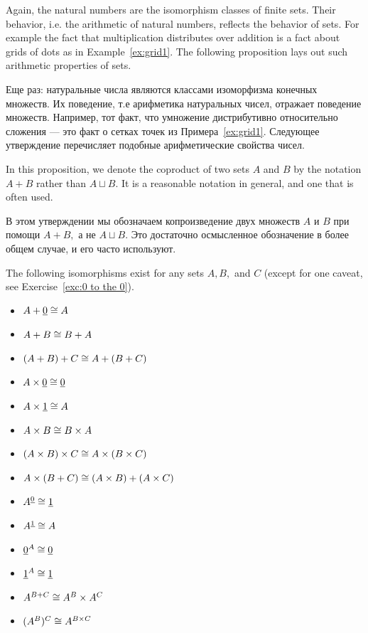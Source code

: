 \documentclass[CT4S-EN-RU]{subfiles}
\begin{document}
\begin{blockENG}
Again, the natural numbers are the isomorphism classes of finite sets. Their behavior, i.e. the arithmetic of natural numbers, reflects the behavior of sets. For example the fact that multiplication distributes over addition is a fact about grids of dots as in Example~\ref{ex:grid1}. The following proposition lays out such arithmetic properties of sets.
\end{blockENG}

\begin{blockRUS}
Еще раз: натуральные числа являются классами изоморфизма конечных множеств. Их поведение, т.е арифметика натуральных чисел, отражает поведение множеств. Например, тот факт, что умножение дистрибутивно относительно сложения — это факт о сетках точек из Примера~\ref{ex:grid1}. Следующее утверждение перечисляет подобные арифметические свойства чисел.
\end{blockRUS}

\begin{blockENG}
In this proposition, we denote the coproduct of two sets $A$ and $B$ by the notation $A+B$ rather than $A\sqcup B.$ It is a reasonable notation in general, and one that is often used. 
\end{blockENG}

\begin{blockRUS}
В этом утверждении мы обозначаем копроизведение двух множеств $A$ и $B$ при помощи $A+B,$ а не $A\sqcup B.$ Это достаточно осмысленное обозначение в более общем случае, и его часто используют. 
\end{blockRUS}

\begin{propositionENG}\label{prop:arithmetic of sets}
The following isomorphisms exist for any sets $A,B,$ and $C$ (except for one caveat, see Exercise~\ref{exc:0 to the 0}). 
 
\begin{itemize}
\item $A+\underline{0}\cong A$
\item $A + B\cong B + A$
\item $(A + B) + C \cong A + (B + C)$
\item $A\times\underline{0}\cong\underline{0}$
\item $A\times\underline{1}\cong A$
\item $A\times B\cong B\times A$
\item $(A\times B)\times C \cong A\times (B\times C)$
\item $A\times(B+C)\cong (A\times B)+(A\times C)$
\item $A^{\underline{0}}\cong \underline{1}$
\item $A^{\underline{1}}\cong A$
\item $\underline{0}^A\cong\underline{0}$
\item $\underline{1}^A\cong\underline{1}$
\item $A^{B+C}\cong A^B\times A^C$
\item $(A^B)^C\cong A^{B\times C}$
\end{itemize}
\end{propositionENG}
\end{document}
